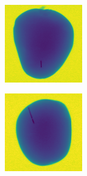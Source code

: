 \documentclass[11pt]{article}
\begin{document}
\begin{figure}[!h]
\begin{subfigure}[b]{0.22\textwidth}
         \caption{}
         \label{fig:metal_11}
     \end{subfigure}
          \\
    \begin{subfigure}[b]{0.22\textwidth}
         \centering
         \includegraphics[width=\textwidth]{figurer/potato_dataset/metal/metal_12.jpg}
         \caption{}
         \label{fig:metal_12}
     \end{subfigure}
     \hfill
     \begin{subfigure}[b]{0.22\textwidth}
         \centering
         \includegraphics[width=\textwidth]{figurer/potato_dataset/metal/metal_13.jpg}

\end{subfigure}
\end{figure}
\end{document}
